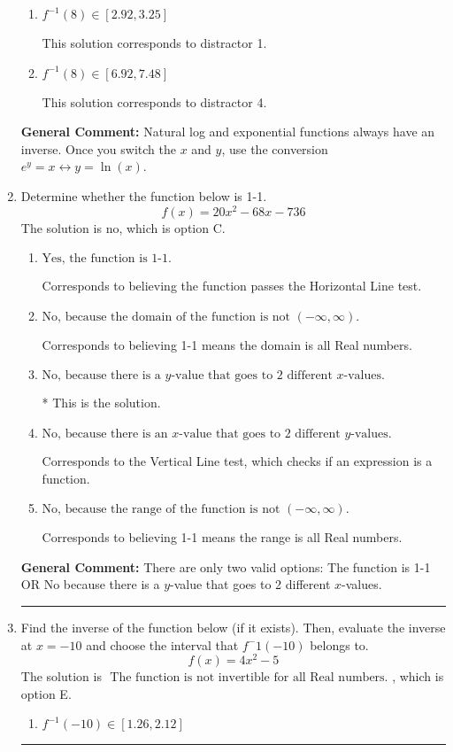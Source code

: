 \documentclass{extbook}[14pt]
\newcommand{\litem}[1]{\item #1

\rule{\textwidth}{0.4pt}}
\begin{document}
\begin{enumerate}
{\begin{enumerate}[label=\Alph*.]
 This is the solution.
\item \( f^{-1}(8) \in [2.92, 3.25] \)

 This solution corresponds to distractor 1.
\item \( f^{-1}(8) \in [6.92, 7.48] \)

 This solution corresponds to distractor 4.
\end{enumerate}

\textbf{General Comment:} Natural log and exponential functions always have an inverse. Once you switch the $x$ and $y$, use the conversion $ e^y = x \leftrightarrow y=\ln(x)$.
}
\litem{
Determine whether the function below is 1-1.
\[ f(x) = 20 x^2 - 68 x - 736 \]The solution is \( \text{no} \), which is option C.\begin{enumerate}[label=\Alph*.]
\item \( \text{Yes, the function is 1-1.} \)

Corresponds to believing the function passes the Horizontal Line test.
\item \( \text{No, because the domain of the function is not $(-\infty, \infty)$.} \)

Corresponds to believing 1-1 means the domain is all Real numbers.
\item \( \text{No, because there is a $y$-value that goes to 2 different $x$-values.} \)

* This is the solution.
\item \( \text{No, because there is an $x$-value that goes to 2 different $y$-values.} \)

Corresponds to the Vertical Line test, which checks if an expression is a function.
\item \( \text{No, because the range of the function is not $(-\infty, \infty)$.} \)

Corresponds to believing 1-1 means the range is all Real numbers.
\end{enumerate}

\textbf{General Comment:} There are only two valid options: The function is 1-1 OR No because there is a $y$-value that goes to 2 different $x$-values.
}
\litem{
Find the inverse of the function below (if it exists). Then, evaluate the inverse at $x = -10$ and choose the interval that $f^-1(-10)$ belongs to.
\[ f(x) = 4 x^2 - 5 \]The solution is \( \text{ The function is not invertible for all Real numbers. } \), which is option E.\begin{enumerate}[label=\Alph*.]
\item \( f^{-1}(-10) \in [1.26, 2.12] \)


\end{enumerate}}
\end{enumerate}
\end{document}

